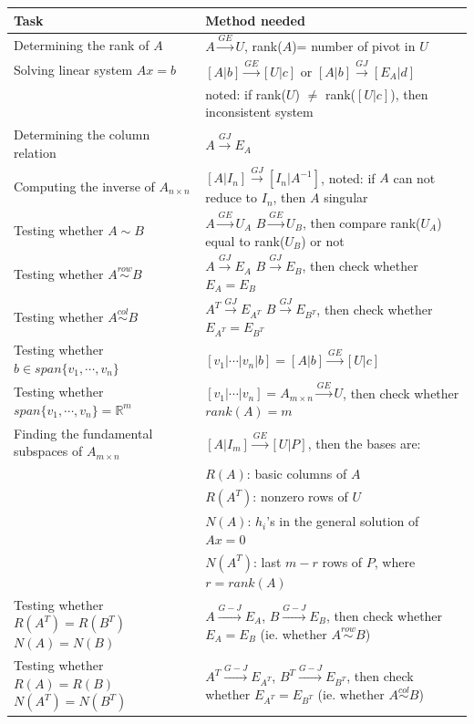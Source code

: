 \documentclass[]{article}
\begin{document}
\begin{table}[H]
\centering
\begin{tabularx}{\textwidth}{X|X}
\hline
Task & Method needed \\ \hline
Determining the rank of $A$ & $A \xrightarrow{GE} U$, rank($A$)= number of pivot in $U$\\
Solving linear system $Ax=b$ & $[A|b]\xrightarrow{GE} [U|c]$ or $[A|b]\xrightarrow{GJ} [E_A|d]$ \\
 & noted: if rank($U$) $\neq$ rank($[U|c]$), then inconsistent system\\
Determining the column relation & $A\xrightarrow{GJ} E_A$\\
Computing the inverse of $A_{n\times n}$ & $[A|I_n]\xrightarrow{GJ} [I_n|A^{-1}]$, noted: if $A$ can not reduce to $I_n$, then $A$ singular\\
Testing whether $A \sim B$ & $A \xrightarrow{GE} U_A$ $B \xrightarrow{GE} U_B$, then compare rank($U_A$) equal to rank($U_B$) or not\\
Testing whether $A \overset{row}{\sim} B$ & $A \xrightarrow{GJ} E_A$ $B \xrightarrow{GJ} E_B$, then check whether $E_A=E_B$\\
Testing whether $A \overset{col}{\sim} B$ & $A^T \xrightarrow{GJ} E_{A^T}$ $B \xrightarrow{GJ} E_{B^T}$, then check whether $E_{A^T}=E_{B^T}$\\
Testing whether $b \in span\{v_1,\cdots,v_n\}$ & $[v_1|\cdots|v_n|b]=[A|b]\xrightarrow{GE} [U|c]$\\
Testing whether $span\{v_1,\cdots ,v_n\}=\mathbb{R}^m$ & $[v_1|\cdots |v_n]=A_{m\times n}\xrightarrow{GE}U$, then check whether $rank(A)=m$\\
Finding the fundamental subspaces of $A_{m\times n}$ & $[A|I_m]\xrightarrow{GE}[U|P]$, then the bases are:\\
~ & $R(A)$: basic columns of $A$\\
~ & $R(A^T)$: nonzero rows of $U$\\
~ & $N(A)$: $h_i$'s in the general solution of $Ax=0$\\
~ & $N(A^T)$: last $m-r$ rows of $P$, where $r=rank(A)$\\
Testing whether $R(A^T)=R(B^T)$ $N(A)=N(B)$ & $A\xrightarrow{G-J}E_A$, $B\xrightarrow{G-J}E_B$, then check whether $E_A=E_B$ (ie. whether $A\overset{row}{\sim}B$)\\
Testing whether $R(A)=R(B)$ $N(A^T)=N(B^T)$ & $A^T\xrightarrow{G-J}E_{A^T}$, $B^T\xrightarrow{G-J}E_{B^{T}}$, then check whether $E_{A^T}=E_{B^T}$ (ie. whether $A\overset{col}{\sim}B$) \\

\end{tabularx}
\end{table}
\end{document}
